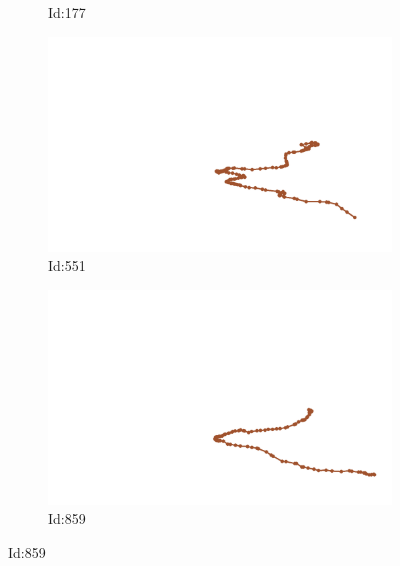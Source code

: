\documentclass[12pt,twoside]{report}
\begin{document}
\begin{figure}
\begin{subfigure}[b]{0.20\textwidth}
\caption{Id:177}
\end{subfigure}
\begin{subfigure}[b]{0.20\textwidth}
\centering
\includegraphics[width=\textwidth]{../../trajectories/551.png}
\caption{Id:551}
\end{subfigure}
\begin{subfigure}[b]{0.20\textwidth}
\centering
\includegraphics[width=\textwidth]{../../trajectories/859.png}
\caption{Id:859}
\end{subfigure}
\end{figure}
\end{document}
